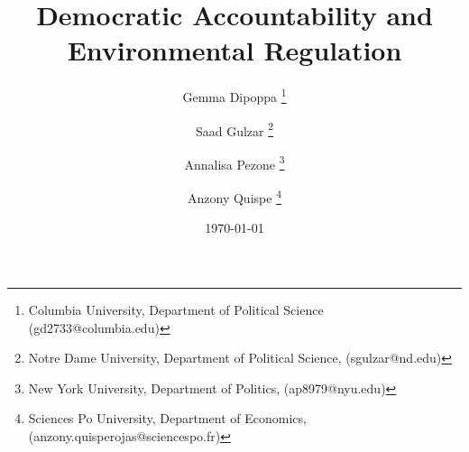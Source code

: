 \documentclass[12pt]{article}
\title{Democratic Accountability and Environmental Regulation}
\author{
Gemma Dipoppa \thanks{Columbia University, Department of Political Science (gd2733@columbia.edu)} 
\and Saad Gulzar \thanks{Notre Dame University, Department of Political Science, (sgulzar@nd.edu)} \and Annalisa Pezone \thanks{New York University, Department of Politics, (ap8979@nyu.edu)} 
\and Anzony Quispe \thanks{Sciences Po University, Department of Economics, (anzony.quisperojas@sciencespo.fr)} 
}
\date{\today}
\begin{document}
\setcounter{page}{0}
	\maketitle
	\thispagestyle{empty}
	
	
	\begin{singlespace}
\begin{abstract}



\end{abstract}
\end{singlespace}
\end{document}
